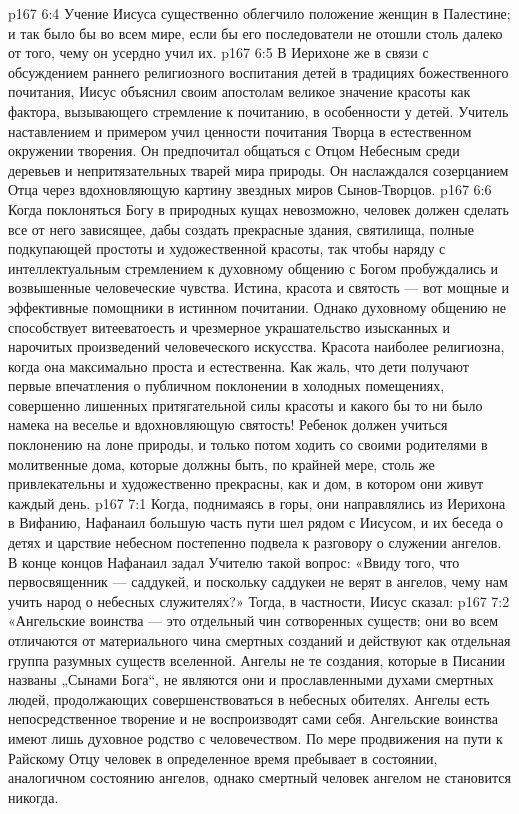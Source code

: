 \vs p167 6:4 \pc Учение Иисуса существенно облегчило положение женщин в Палестине; и так было бы во всем мире, если бы его последователи не отошли столь далеко от того, чему он усердно учил их.
\vs p167 6:5 \pc В Иерихоне же в связи с обсуждением раннего религиозного воспитания детей в традициях божественного почитания, Иисус объяснил своим апостолам великое значение красоты как фактора, вызывающего стремление к почитанию, в особенности у детей. Учитель наставлением и примером учил ценности почитания Творца в естественном окружении творения. Он предпочитал общаться с Отцом Небесным среди деревьев и непритязательных тварей мира природы. Он наслаждался созерцанием Отца через вдохновляющую картину звездных миров Сынов\hyp{}Творцов.
\vs p167 6:6 Когда поклоняться Богу в природных кущах невозможно, человек должен сделать все от него зависящее, дабы создать прекрасные здания, святилища, полные подкупающей простоты и художественной красоты, так чтобы наряду с интеллектуальным стремлением к духовному общению с Богом пробуждались и возвышенные человеческие чувства. Истина, красота и святость --- вот мощные и эффективные помощники в истинном почитании. Однако духовному общению не способствует витееватоесть и чрезмерное украшательство изысканных и нарочитых произведений человеческого искусства. Красота наиболее религиозна, когда она максимально проста и естественна. Как жаль, что дети получают первые впечатления о публичном поклонении в холодных помещениях, совершенно лишенных притягательной силы красоты и какого бы то ни было намека на веселье и вдохновляющую святость! Ребенок должен учиться поклонению на лоне природы, и только потом ходить со своими родителями в молитвенные дома, которые должны быть, по крайней мере, столь же привлекательны и художественно прекрасны, как и дом, в котором они живут каждый день.
\vs p167 7:1 Когда, поднимаясь в горы, они направлялись из Иерихона в Вифанию, Нафанаил большую часть пути шел рядом с Иисусом, и их беседа о детях и царствие небесном постепенно подвела к разговору о служении ангелов. В конце концов Нафанаил задал Учителю такой вопрос: «Ввиду того, что первосвященник --- саддукей, и поскольку саддукеи не верят в ангелов, чему нам учить народ о небесных служителях?» Тогда, в частности, Иисус сказал:
\vs p167 7:2 \pc «Ангельские воинства --- это отдельный чин сотворенных существ; они во всем отличаются от материального чина смертных созданий и действуют как отдельная группа разумных существ вселенной. Ангелы не те создания, которые в Писании названы „Сынами Бога“, не являются они и прославленными духами смертных людей, продолжающих совершенствоваться в небесных обителях. Ангелы есть непосредственное творение и не воспроизводят сами себя. Ангельские воинства имеют лишь духовное родство с человечеством. По мере продвижения на пути к Райскому Отцу человек в определенное время пребывает в состоянии, аналогичном состоянию ангелов, однако смертный человек ангелом не становится никогда.
